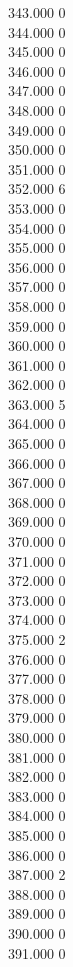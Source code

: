 { 343.000	0 \\
 344.000	0 \\
 345.000	0 \\
 346.000	0 \\
 347.000	0 \\
 348.000	0 \\
 349.000	0 \\
 350.000	0 \\
 351.000	0 \\
 352.000	6 \\
 353.000	0 \\
 354.000	0 \\
 355.000	0 \\
 356.000	0 \\
 357.000	0 \\
 358.000	0 \\
 359.000	0 \\
 360.000	0 \\
 361.000	0 \\
 362.000	0 \\
 363.000	5 \\
 364.000	0 \\
 365.000	0 \\
 366.000	0 \\
 367.000	0 \\
 368.000	0 \\
 369.000	0 \\
 370.000	0 \\
 371.000	0 \\
 372.000	0 \\
 373.000	0 \\
 374.000	0 \\
 375.000	2 \\
 376.000	0 \\
 377.000	0 \\
 378.000	0 \\
 379.000	0 \\
 380.000	0 \\
 381.000	0 \\
 382.000	0 \\
 383.000	0 \\
 384.000	0 \\
 385.000	0 \\
 386.000	0 \\
 387.000	2 \\
 388.000	0 \\
 389.000	0 \\
 390.000	0 \\
 391.000	0 \\
}
